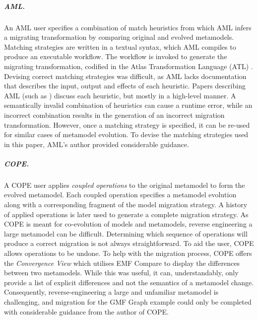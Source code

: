 \subparagraph{AML.} An AML user specifies a combination of match heuristics from which AML infers a migrating transformation by comparing original and evolved metamodels. Matching strategies are written in a textual syntax, which AML compiles to produce an executable workflow. The workflow is invoked to generate the migrating transformation, codified in the Atlas Transformation Language (ATL) \cite{jouault05transforming}.
%
Devising correct matching strategies was difficult, as AML lacks documentation that describes the input, output and effects of each heuristic. Papers describing AML (such as \cite{garces09managing}) discuss each heuristic, but mostly in a high-level manner. A semantically invalid combination of heuristics can cause a runtime error, while an incorrect combination results in the generation of an incorrect migration transformation. However, once a matching strategy is specified, it can be re-used for similar cases of metamodel evolution. To devise the matching strategies used in this paper, AML's author provided considerable guidance.

\subparagraph{COPE.} A COPE user applies \emph{coupled operations} to the original metamodel to form the evolved metamodel. Each coupled operation specifies a metamodel evolution along with a corresponding fragment of the model migration strategy. A history of applied operations is later used to generate a complete migration strategy.
%
As COPE is meant for co-evolution of models and metamodels, reverse engineering a large metamodel can be difficult. Determining which sequence of operations will produce a correct migration is not always straightforward. To aid the user, COPE allows operations to be undone.
%
To help with the migration process, COPE offers the \emph{Convergence View} which utilises EMF Compare to display the differences between two metamodels. While this was useful, it can, understandably, only provide a list of explicit differences and not the semantics of a metamodel change. Consequently, reverse-engineering a large and unfamiliar metamodel is challenging, and migration for the GMF Graph example could only be completed with considerable guidance from the author of COPE. %

